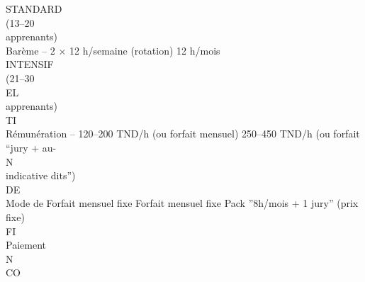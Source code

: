 \documentclass[12pt,landscape,a4paper]{article}
\begin{document}
STANDARD\\
(13–20\\
apprenants)\\
\vspace{0.5em}
Barème         –                       2 × 12 h/semaine (rotation)           12 h/mois\\
INTENSIF\\
(21–30\\
\vspace{0.5em}
\vspace{0.5em}
\vspace{0.5em}
\vspace{0.5em}
EL\\
apprenants)\\
\vspace{0.5em}
\vspace{0.5em}
\vspace{0.5em}
\vspace{0.5em}
TI\\
Rémunération –                         120–200 TND/h (ou forfait mensuel)    250–450 TND/h (ou forfait “jury + au-\\
\vspace{0.5em}
\vspace{0.5em}
\vspace{0.5em}
\vspace{0.5em}
N\\
indicative                                                                   dits”)\\
\vspace{0.5em}
\vspace{0.5em}
\vspace{0.5em}
\vspace{0.5em}
DE\\
Mode de        Forfait mensuel fixe    Forfait mensuel fixe                  Pack ”8h/mois + 1 jury” (prix fixe)\\
\vspace{0.5em}
\vspace{0.5em}
\vspace{0.5em}
\vspace{0.5em}
FI\\
Paiement\\
\vspace{0.5em}
\vspace{0.5em}
\vspace{0.5em}
N\\
CO\\
\vspace{0.5em}
\end{document}
